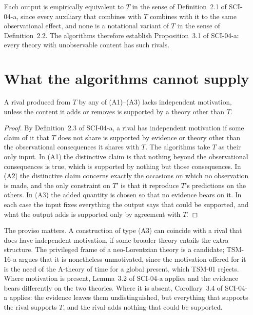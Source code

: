 \documentclass{situationist-preprint}
\begin{document}
Each output is empirically equivalent to $T$ in the sense of Definition~2.1 of SCI-04-a, since every auxiliary that combines with $T$ combines with it to the same observational effect, and none is a notational variant of $T$ in the sense of Definition~2.2. The algorithms therefore establish Proposition~3.1 of SCI-04-a: every theory with unobservable content has such rivals.

\section{What the algorithms cannot supply}\label{s:motivation}

\begin{proposition}\label{p:nomotiv}
A rival produced from $T$ by any of (A1)--(A3) lacks independent motivation, unless the content it adds or removes is supported by a theory other than $T$.
\end{proposition}

\begin{proof}
By Definition~2.3 of SCI-04-a, a rival has independent motivation if some claim of it that $T$ does not share is supported by evidence or theory other than the observational consequences it shares with $T$. The algorithms take $T$ as their only input. In (A1) the distinctive claim is that nothing beyond the observational consequences is true, which is supported by nothing but those consequences. In (A2) the distinctive claim concerns exactly the occasions on which no observation is made, and the only constraint on $T'$ is that it reproduce $T$'s predictions on the others. In (A3) the added quantity is chosen so that no evidence bears on it. In each case the input fixes everything the output says that could be supported, and what the output adds is supported only by agreement with $T$.
\end{proof}

The proviso matters. A construction of type (A3) can coincide with a rival that does have independent motivation, if some broader theory entails the extra structure. The privileged frame of a neo-Lorentzian theory is a candidate; TSM-16-a argues that it is nonetheless unmotivated, since the motivation offered for it is the need of the A-theory of time for a global present, which TSM-01 rejects. Where motivation is present, Lemma~3.2 of SCI-04-a applies and the evidence bears differently on the two theories. Where it is absent, Corollary~3.4 of SCI-04-a applies: the evidence leaves them undistinguished, but everything that supports the rival supports $T$, and the rival adds nothing that could be supported.
\end{document}
